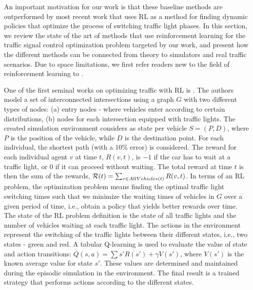 \documentclass[a4paper,twoside]{article}
\begin{document}
An important motivation for our work is that these baseline methods are outperformed by most recent work that uses RL as a method for finding dynamic policies that optimize the process of switching traffic light phases. In this section, we review the state of the art of methods that use reinforcement learning for the traffic signal control optimization problem targeted by our work, and present how the different methods can be connected from theory to simulators and real traffic scenarios. Due to space limitations, we first refer readers new to the field of reinforcement learning to \cite{suttonbook}.

One of the first seminal works on optimizing traffic with RL is \cite{WiVre04}. The authors model a set of interconnected intersections using a graph $G$ with two different types of nodes: (a) entry nodes - where vehicles enter according to certain distributions, (b) nodes for each intersection equipped with traffic lights. The created simulation environment considers as state per vehicle $S=(P,D)$, where $P$ is the position of the vehicle, while $D$ is the destination point. For each individual, the shortest path (with a $10\%$ error) is considered. The reward for each individual agent $v$ at time $t$, $R(v,t)$, is $-1$ if the car has to wait at a traffic light, or 0 if it can proceed without waiting. The total reward at time $t$ is then the sum of the rewards, $\mathcal{R}(t)=\sum_{v \in AllVehicles(t)}{R(v,t)}$. In terms of an RL problem, the optimization problem means finding the optimal traffic light switching times such that we minimize the waiting times of vehicles in $G$ over a given period of time, i.e., obtain a policy that yields better rewards over time. The state of the RL problem definition is the state of all traffic lights and the number of vehicles waiting at each traffic light. The actions in the environment represent the switching of the traffic lights between their different states, i.e., two states - green and red. A tabular Q-learning is used to evaluate the value of state and action transitions:
$Q(s, a) = \sum{s'}{R(s') + \gamma V(s')}$, where $V(s')$ is the known average value for state $s'$. These values are determined and maintained during the episodic simulation in the environment. The final result is a trained strategy that performs actions according to the different states.
\end{document}
